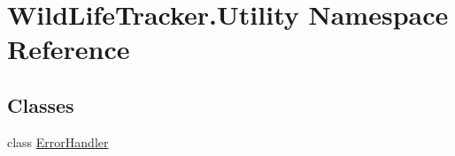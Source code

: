 \hypertarget{namespaceWildLifeTracker_1_1Utility}{}\section{Wild\+Life\+Tracker.\+Utility Namespace Reference}
\label{namespaceWildLifeTracker_1_1Utility}
\subsection*{Classes}
\begin{DoxyCompactItemize}
\item 
class \hyperlink{classWildLifeTracker_1_1Utility_1_1ErrorHandler}{Error\+Handler}
\end{DoxyCompactItemize}
